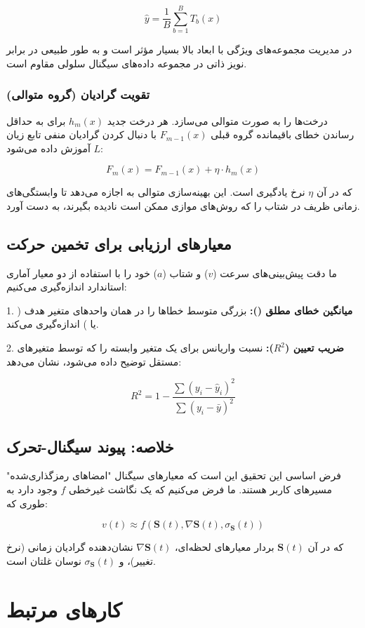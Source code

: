 \documentclass{CSICC}
\begin{document}
\[
\hat{y}=\frac{1}{B}\sum_{b=1}^{B}T_{b}(x)
\]

 در مدیریت مجموعه‌های ویژگی با ابعاد بالا بسیار مؤثر است و به طور طبیعی در برابر نویز ذاتی در مجموعه داده‌های سیگنال سلولی مقاوم است.

\subsubsection{تقویت گرادیان (گروه متوالی)}
 درخت‌ها را به صورت متوالی می‌سازد. هر درخت جدید \(h_{m}(x)\) برای به حداقل رساندن خطای باقیمانده گروه قبلی \(F_{m-1}(x)\) با دنبال کردن گرادیان منفی تابع زیان \(L\) آموزش داده می‌شود:

\[
F_{m}(x)=F_{m-1}(x)+\eta\cdot h_{m}(x)
\]

که در آن \(\eta\) نرخ یادگیری است. این بهینه‌سازی متوالی به  اجازه می‌دهد تا وابستگی‌های زمانی ظریف در شتاب را که روش‌های موازی ممکن است نادیده بگیرند، به دست آورد.

\subsection{معیارهای ارزیابی برای تخمین حرکت}
ما دقت پیش‌بینی‌های سرعت (\(v\)) و شتاب (\(a\)) خود را با استفاده از دو معیار آماری استاندارد اندازه‌گیری می‌کنیم:

1. \textbf{میانگین خطای مطلق ():} بزرگی متوسط خطاها را در همان واحدهای متغیر هدف ( یا ) اندازه‌گیری می‌کند.

2. \textbf{ضریب تعیین (\(R^2\)):} نسبت واریانس برای یک متغیر وابسته را که توسط متغیرهای مستقل توضیح داده می‌شود، نشان می‌دهد:

\[
R^2 = 1 - \frac{\sum(y_i - \hat{y}_i)^2}{\sum(y_i - \bar{y})^2}
\]

\subsection{خلاصه: پیوند سیگنال-تحرک}
فرض اساسی این تحقیق این است که معیارهای سیگنال  "امضاهای رمزگذاری‌شده" مسیرهای کاربر هستند. ما فرض می‌کنیم که یک نگاشت غیرخطی \(f\) وجود دارد به طوری که:

\[
v(t) \approx f\left(\mathbf{S}(t), \nabla\mathbf{S}(t), \sigma_{\mathbf{S}}(t)\right)
\]

که در آن \(\mathbf{S}(t)\) بردار معیارهای لحظه‌ای، \(\nabla\mathbf{S}(t)\) نشان‌دهنده گرادیان زمانی (نرخ تغییر)، و \(\sigma_{\mathbf{S}}(t)\) نوسان غلتان است.


\section{کارهای مرتبط}
\end{document}
